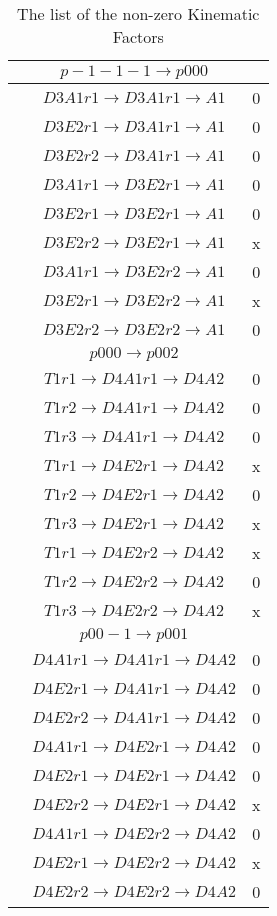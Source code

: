 \documentclass[10pt]{article}
\begin{document}
\begin{table}[!htbp]
\caption {The list of the non-zero Kinematic Factors}
\begin{minipage}{0.33\textwidth}
\raggedright
\begin{tabular}{cc c}

 &$p-1-1-1 \rightarrow p000 $ \\ \hline
 & $D3A1 r1 \rightarrow D3A1 r1 \rightarrow A1$ & 0\\
 & $D3E2 r1 \rightarrow D3A1 r1 \rightarrow A1$ &  0\\
 & $D3E2 r2 \rightarrow D3A1 r1 \rightarrow A1$ &  0\\
 & $D3A1 r1 \rightarrow D3E2 r1 \rightarrow A1$ &  0\\
 & $D3E2 r1 \rightarrow D3E2 r1 \rightarrow A1$ &  0\\
 & $D3E2 r2 \rightarrow D3E2 r1 \rightarrow A1$ &  x\\
 & $D3A1 r1 \rightarrow D3E2 r2 \rightarrow A1$ &  0\\
 & $D3E2 r1 \rightarrow D3E2 r2 \rightarrow A1$ &  x\\
 & $D3E2 r2 \rightarrow D3E2 r2 \rightarrow A1$ &  0\\

\hline

 &$p000 \rightarrow p002 $ \\ \hline
 & $T1 r1 \rightarrow D4A1 r1 \rightarrow D4A2$ & 0\\
 & $T1 r2 \rightarrow D4A1 r1 \rightarrow D4A2$ &  0\\
 & $T1 r3 \rightarrow D4A1 r1 \rightarrow D4A2$ &  0\\
 & $T1 r1 \rightarrow D4E2 r1 \rightarrow D4A2$ &  x\\
 & $T1 r2 \rightarrow D4E2 r1 \rightarrow D4A2$ &  0\\
 & $T1 r3 \rightarrow D4E2 r1 \rightarrow D4A2$ &  x\\
 & $T1 r1 \rightarrow D4E2 r2 \rightarrow D4A2$ &  x\\
 & $T1 r2 \rightarrow D4E2 r2 \rightarrow D4A2$ &  0\\
 & $T1 r3 \rightarrow D4E2 r2 \rightarrow D4A2$ &  x\\

\hline

 &$p00-1 \rightarrow p001 $ \\ \hline
 & $D4A1 r1 \rightarrow D4A1 r1 \rightarrow D4A2$ & 0\\
 & $D4E2 r1 \rightarrow D4A1 r1 \rightarrow D4A2$ &  0\\
 & $D4E2 r2 \rightarrow D4A1 r1 \rightarrow D4A2$ &  0\\
 & $D4A1 r1 \rightarrow D4E2 r1 \rightarrow D4A2$ &  0\\
 & $D4E2 r1 \rightarrow D4E2 r1 \rightarrow D4A2$ &  0\\
 & $D4E2 r2 \rightarrow D4E2 r1 \rightarrow D4A2$ &  x\\
 & $D4A1 r1 \rightarrow D4E2 r2 \rightarrow D4A2$ &  0\\
 & $D4E2 r1 \rightarrow D4E2 r2 \rightarrow D4A2$ &  x\\
 & $D4E2 r2 \rightarrow D4E2 r2 \rightarrow D4A2$ &  0\\


\end{tabular}
\end{minipage}
\end{table}
\end{document}
